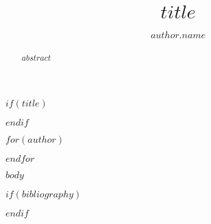 \documentclass{josis}
\begin{document}


$if(title)$
\title{$title$}
$endif$

$for(author)$
  \author{$author.name$}
$endfor$

\maketitle


\begin{abstract}
$abstract$
\end{abstract}

$body$

$if(bibliography)$


$endif$
\end{document}
